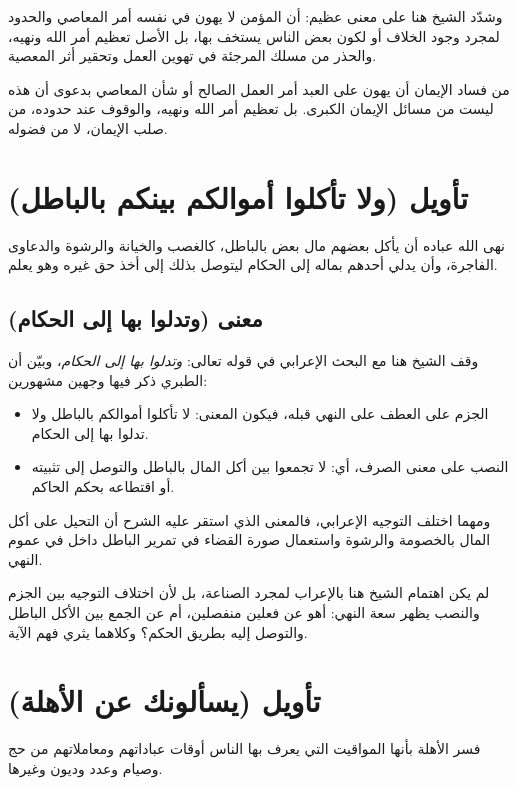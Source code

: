 وشدّد الشيخ هنا على معنى عظيم: أن المؤمن لا يهون في نفسه أمر المعاصي والحدود لمجرد وجود الخلاف أو لكون بعض الناس يستخف بها، بل الأصل تعظيم أمر الله ونهيه، والحذر من مسلك المرجئة في تهوين العمل وتحقير أثر المعصية.

\begin{fawaid}
من فساد الإيمان أن يهون على العبد أمر العمل الصالح أو شأن المعاصي بدعوى أن هذه ليست من مسائل الإيمان الكبرى. بل تعظيم أمر الله ونهيه، والوقوف عند حدوده، من صلب الإيمان، لا من فضوله.
\end{fawaid}

\separator

\section{تأويل (ولا تأكلوا أموالكم بينكم بالباطل)}
 نهى الله عباده أن يأكل بعضهم مال بعض بالباطل، كالغصب والخيانة والرشوة والدعاوى الفاجرة، وأن يدلي أحدهم بماله إلى الحكام ليتوصل بذلك إلى أخذ حق غيره وهو يعلم.

\subsection{معنى (وتدلوا بها إلى الحكام)}
وقف الشيخ هنا مع البحث الإعرابي في قوله تعالى: \textit{وتدلوا بها إلى الحكام}، وبيّن أن الطبري ذكر فيها وجهين مشهورين:
\begin{itemize}
    \item الجزم على العطف على النهي قبله، فيكون المعنى: لا تأكلوا أموالكم بالباطل ولا تدلوا بها إلى الحكام.
    \item النصب على معنى الصرف، أي: لا تجمعوا بين أكل المال بالباطل والتوصل إلى تثبيته أو اقتطاعه بحكم الحاكم.
\end{itemize}

ومهما اختلف التوجيه الإعرابي، فالمعنى الذي استقر عليه الشرح أن التحيل على أكل المال بالخصومة والرشوة واستعمال صورة القضاء في تمرير الباطل داخل في عموم النهي.

\begin{fawaid}
لم يكن اهتمام الشيخ هنا بالإعراب لمجرد الصناعة، بل لأن اختلاف التوجيه بين الجزم والنصب يظهر سعة النهي: أهو عن فعلين منفصلين، أم عن الجمع بين الأكل الباطل والتوصل إليه بطريق الحكم؟ وكلاهما يثري فهم الآية.
\end{fawaid}

\separator

\section{تأويل (يسألونك عن الأهلة)}
فسر  الأهلة بأنها المواقيت التي يعرف بها الناس أوقات عباداتهم ومعاملاتهم من حج وصيام وعدد وديون وغيرها.

